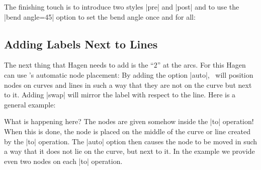 The finishing touch is to introduce two styles |pre| and |post| and to use the
|bend angle=45| option to set the bend angle once and for all:
%
\begin{codeexample}[preamble={\usetikzlibrary{arrows.meta,positioning}}]
\end{codeexample}


\subsection{Adding Labels Next to Lines}

The next thing that Hagen needs to add is the ``$2$'' at the arcs. For this
Hagen can use \tikzname's automatic node placement: By adding the option
|auto|, \tikzname\ will position nodes on curves and lines in such a way that
they are not on the curve but next to it. Adding |swap| will mirror the label
with respect to the line. Here is a general example:
%
\begin{codeexample}[]
\end{codeexample}

What is happening here? The nodes are given somehow inside the |to| operation!
When this is done, the node is placed on the middle of the curve or line
created by the |to| operation. The |auto| option then causes the node to be
moved in such a way that it does not lie on the curve, but next to it. In the
example we provide even two nodes on each |to| operation.

